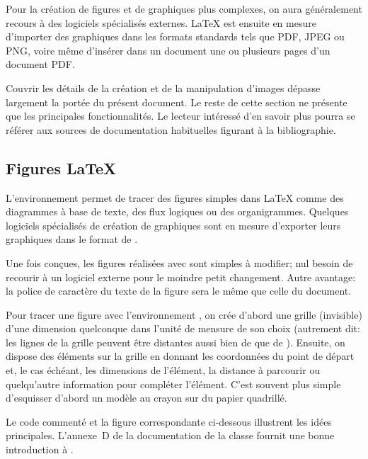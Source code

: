 Pour la création de figures et de graphiques plus complexes, on aura généralement
recours à des logiciels spécialisés externes. {\LaTeX} est ensuite en
mesure d'importer des graphiques dans les formats standards tels que PDF, JPEG
ou PNG, voire même d'insérer dans un document une ou plusieurs pages
d'un document PDF.

Couvrir les détails de la création et de la manipulation d'images
dépasse largement la portée du présent document. Le reste de cette
section ne présente que les principales fonctionnalités. Le lecteur
intéressé d'en savoir plus pourra se référer aux sources de documentation habituelles figurant à la
bibliographie.


\subsection{Figures {\LaTeX}}
\label{sec:tableaux:figures:picture}

L'environnement  permet de tracer des figures simples dans
{\LaTeX} comme des diagrammes à base de texte, des flux logiques ou
des organigrammes. Quelques logiciels spécialisés de création de
graphiques sont en mesure d'exporter leurs graphiques dans le format
de .

Une fois conçues, les figures réalisées avec  sont
simples à modifier; nul besoin de recourir à un logiciel externe pour
le moindre petit changement. Autre avantage: la police de caractère du texte
de la figure sera le même que celle du document.

Pour tracer une figure avec l'environnement , on crée
d'abord une grille (invisible) d'une dimension quelconque dans l'unité
de mensure de son choix (autrement dit: les lignes de la grille
peuvent être distantes aussi bien de \code{1pt} que de \code{1cm}).
Ensuite, on dispose des éléments sur la grille en donnant les
coordonnées du point de départ et, le cas échéant, les dimensions de
l'élément, la distance à parcourir ou quelqu'autre information pour
compléter l'élément. C'est souvent plus simple d'esquisser d'abord un modèle au
crayon sur du papier quadrillé.

Le code commenté et la figure correspondante ci-dessous  illustrent
les idées principales. L'annexe~D de la documentation de la classe
 fournit une bonne introduction à .

